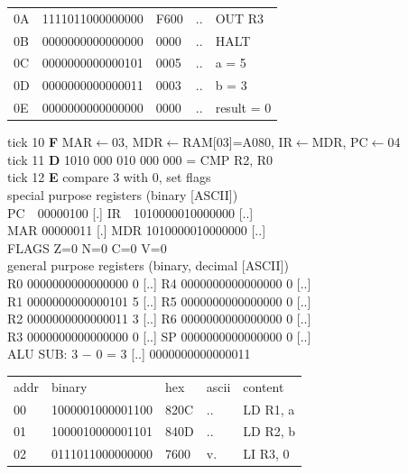 \begin{tcolorbox}[stepbox, title={Instruction 3 \hfill ticks 7 to 9 \quad LI R3, 0}]
{\begin{tabular}{@{}lllll@{}}
0A & 1111011000000000 & F600 & .. & OUT R3\\
0B & 0000000000000000 & 0000 & .. & HALT\\
\rowcolor{datac}0C & 0000000000000101 & 0005 & .. & a = 5\\
\rowcolor{datac}0D & 0000000000000011 & 0003 & .. & b = 3\\
\rowcolor{datac}0E & 0000000000000000 & 0000 & .. & result = 0\\
\end{tabular}}
\end{tcolorbox}\hfill\begin{tcolorbox}[stepbox, title={Instruction 4 \hfill ticks 10 to 12 \quad CMP R2, R0}]
\textcolor{dim}{tick 10} \textbf{F} MAR$\leftarrow$03, MDR$\leftarrow$RAM[03]=A080, IR$\leftarrow$MDR, PC$\leftarrow$04\\
\textcolor{dim}{tick 11} \textbf{D} 1010 000 010 000 000 = CMP R2, R0\\
\textcolor{dim}{tick 12} \textbf{E} compare 3 with 0, set flags\\[2pt]
\textcolor{dim}{special purpose registers (binary [ASCII])}\\
PC~~00000100 [.] \hfill IR~~1010000010000000 [..]\\
MAR 00000011 [.] \hfill MDR 1010000010000000 [..]\\
FLAGS Z=0 N=0 C=0 V=0\\[2pt]
\textcolor{dim}{general purpose registers (binary, decimal [ASCII])}\\
R0 0000000000000000 0 [..] \hfill R4 0000000000000000 0 [..]\\
R1 0000000000000101 5 [..] \hfill R5 0000000000000000 0 [..]\\
R2 0000000000000011 3 [..] \hfill R6 0000000000000000 0 [..]\\
R3 0000000000000000 0 [..] \hfill SP 0000000000000000 0 [..]\\
\textcolor{dim}{ALU} SUB: 3 $-$ 0 = 3 [..] \hfill 0000000000000011\\[2pt]
{\setlength{\tabcolsep}{2pt}\begin{tabular}{@{}lllll@{}}
\textcolor{dim}{addr} & \textcolor{dim}{binary} & \textcolor{dim}{hex} & \textcolor{dim}{ascii} & \textcolor{dim}{content}\\
00 & 1000001000001100 & 820C & .. & LD R1, a\\
01 & 1000010000001101 & 840D & .. & LD R2, b\\
02 & 0111011000000000 & 7600 & v. & LI R3, 0\\

\end{tabular}}
\end{tcolorbox}
